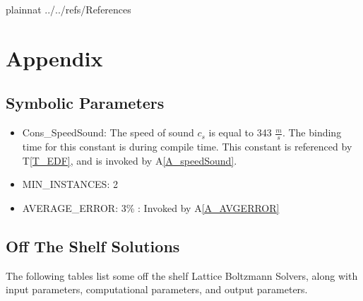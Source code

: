 \documentclass[12pt]{article}
\begin{document}
 {plainnat}
 {../../refs/References}

\newpage

\section{Appendix}


\subsection{Symbolic Parameters}
\label{symbolicpara}

\begin{itemize}

\item[\label{Cons_SpeedSound}]Cons\_SpeedSound: The speed of sound $c_s$ is equal to 343 $\frac{m}{s}$. The binding time for this constant is during compile time. This constant is referenced by T\ref{T_EDF}, and is invoked by A\ref{A_speedSound}.
\item[\label{Cons_MIN_INSTANCES}]MIN\_INSTANCES: 2
\item[\label{Cons_AVERAGE_ERROR}]AVERAGE\_ERROR: 3\% : Invoked by A\ref{A_AVGERROR}
\end{itemize}

\subsection{Off The Shelf Solutions}
\label{OTSsolutions}

The following tables list some off the shelf Lattice Boltzmann Solvers, along with input parameters, computational parameters, and output parameters.
\end{document}
